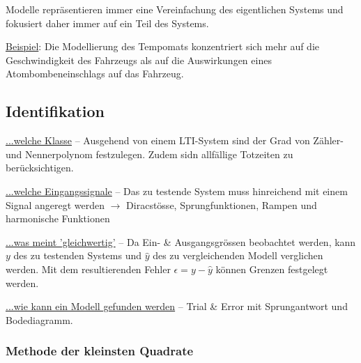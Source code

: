 \documentclass[
  10pt,
  a4paper,
  twocolumn]{article}
\numberwithin{equation}{section}
\begin{document}
\begin{tcolorbox}[enhanced jigsaw, coltitle=black, colback=white, breakable, colframe=quarto-callout-important-color-frame, rightrule=.15mm, left=2mm, opacityback=0, leftrule=.75mm, toptitle=1mm, colbacktitle=quarto-callout-important-color!10!white, bottomtitle=1mm, arc=.35mm, bottomrule=.15mm, title=\textcolor{quarto-callout-important-color}{\faExclamation}\hspace{0.5em}{Vereinfachung}, titlerule=0mm, toprule=.15mm, opacitybacktitle=0.6]

Modelle repräsentieren immer eine Vereinfachung des eigentlichen Systems
und fokusiert daher immer auf ein Teil des Systems.

\vspace{2mm}

\ul{Beispiel}: Die Modellierung des Tempomats konzentriert sich mehr auf
die Geschwindigkeit des Fahrzeugs als auf die Auswirkungen eines
Atombombeneinschlags auf das Fahrzeug.

\end{tcolorbox}

\subsection{Identifikation}\label{identifikation}

\underline{\footnotesize{...welche Klasse}} -- Ausgehend von einem
LTI-System sind der Grad von Zähler- und Nennerpolynom festzulegen.
Zudem sidn allfällige Totzeiten zu berücksichtigen.

\underline{\footnotesize{...welche Eingangssignale}} -- Das zu testende
System muss hinreichend mit einem Signal angeregt werden \(\rightarrow\)
Diracstösse, Sprungfunktionen, Rampen und harmonische Funktionen

\underline{\footnotesize{...was meint 'gleichwertig'}} -- Da Ein- \&
Ausgangsgrössen beobachtet werden, kann \(y\) des zu testenden Systems
und \(\hat{y}\) des zu vergleichenden Modell verglichen werden. Mit dem
resultierenden Fehler \(\epsilon = y - \hat{y}\) können Grenzen
festgelegt werden.

\underline{\footnotesize{...wie kann ein Modell gefunden werden}} --
Trial \& Error mit Sprungantwort und Bodediagramm.

\subsubsection{Methode der kleinsten
Quadrate}\label{methode-der-kleinsten-quadrate}
\end{document}
